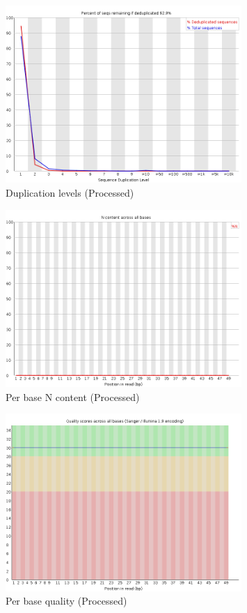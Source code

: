 \documentclass[UTF8]{ctexart}
\begin{document}
\begin{figure}[!htb]
	\centering
	\includegraphics[width=0.8\textwidth]{img/SRR14325859_FastQC_Processed_img/duplication_levels.png}	
	\caption{Duplication levels (Processed)\protect}    
\end{figure}

\begin{figure}[!htb]
	\centering
	\includegraphics[width=0.8\textwidth]{img/SRR14325859_FastQC_Processed_img/per_base_n_content.png}	
	\caption{Per base N content (Processed)\protect}    
\end{figure}


\begin{figure}[!htb]
	\centering
	\includegraphics[width=0.8\textwidth]{img/SRR14325859_FastQC_Processed_img/per_base_quality.png}	
	\caption{Per base quality (Processed)\protect}    
\end{figure}
\end{document}
